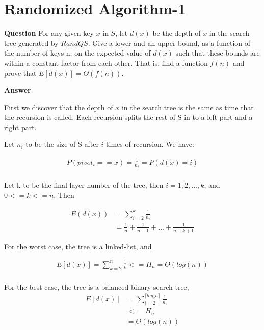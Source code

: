 \documentclass[12pt]{article}
\begin{document}
\section{Randomized Algorithm-1}
\textbf{Question}
For any given key $x$ in $S$, let $d(x)$ be the depth of $x$ in the search tree generated by $RandQS$. Give a lower and an upper bound, as a function of the number of keys n, on the expected value of $d(x)$ such that these bounds are within a constant factor from each other. That is, find a function $f(n)$ and prove that $E[d(x)]=\Theta(f(n))$.

\textbf{Answer}

First we discover that the depth of $x$ in the search tree is the same as time that the recursion is called. Each recursion splits the rest of S in to a left part and a right part.

Let $n_i$ to be the size of S after $i$ times of recursion. We have:

\begin{equation}
\begin{aligned}
P(pivot_i == x) = \frac{1}{n_i} = P(d(x) = i)\\
\end{aligned}
\end{equation}

Let k to be the final layer number of the tree, then $i=1,2,...,k$, and $0 <= k <= n$. Then

\begin{equation}
\begin{aligned}
E(d(x)) &= \sum_{i=2}^{k}  \frac{1}{n_i}\\
&= \frac{1}{n} + \frac{1}{n-1} + ... + \frac{1}{n-k+1} 
\end{aligned}
\end{equation}

For the worst case, the tree is a linked-list, and 

\begin{equation}
\begin{aligned}
E[d(x)] = \sum_{k=2}^{n} \frac{1}{k} <= H_n = \Theta(log(n))\\
\end{aligned}
\end{equation}

For the best case, the tree is a balanced binary search tree, 
\begin{equation}
\begin{aligned}
E[d(x)] &= \sum_{i=2}^{\lceil log_2 n \rceil}  \frac{1}{n_i} \\
&<= H_n \\
&= \Theta(log(n))\\
\end{aligned}
\end{equation}
\end{document}
